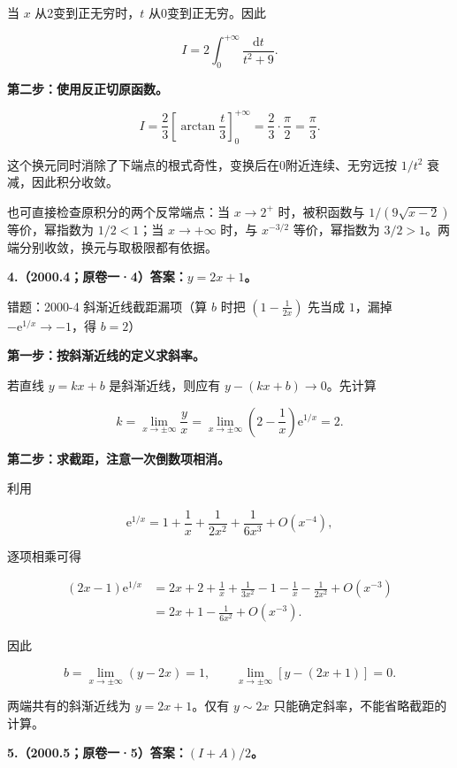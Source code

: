 \documentclass[UTF8,11pt,fontset=windows]{ctexart}
\begin{document}
当 $x$ 从2变到正无穷时，$t$ 从0变到正无穷。因此

$$
I=2\int_0^{+\infty}\frac{\mathrm dt}{t^2+9}.
$$

\textbf{第二步：使用反正切原函数。}

$$
I=\frac23\left[\arctan\frac t3\right]_0^{+\infty}
=\frac23\cdot\frac\pi2=\frac\pi3.
$$

这个换元同时消除了下端点的根式奇性，变换后在0附近连续、无穷远按 $1/t^2$ 衰减，因此积分收敛。

也可直接检查原积分的两个反常端点：当 $x\to2^+$ 时，被积函数与 $1/(9\sqrt{x-2})$ 等价，幂指数为 $1/2<1$；当 $x\to+\infty$ 时，与 $x^{-3/2}$ 等价，幂指数为 $3/2>1$。两端分别收敛，换元与取极限都有依据。

\clearpage

\textbf{4.（2000.4；原卷一·4）答案：$y=2x+1$。}

\begingroup\color{gray}错题：2000-4 斜渐近线截距漏项（算 $b$ 时把 $\left(1-\frac1{2x}\right)$ 先当成 $1$，漏掉 $-\mathrm e^{1/x}\to-1$，得 $b=2$）\par\endgroup

\textbf{第一步：按斜渐近线的定义求斜率。}

若直线 $y=kx+b$ 是斜渐近线，则应有 $y-(kx+b)\to0$。先计算

$$
k=\lim_{x\to\pm\infty}\frac yx
=\lim_{x\to\pm\infty}\left(2-\frac1x\right)\mathrm e^{1/x}=2.
$$

\textbf{第二步：求截距，注意一次倒数项相消。}

利用

$$
\mathrm e^{1/x}=1+\frac1x+\frac1{2x^2}+\frac1{6x^3}+O(x^{-4}),
$$

逐项相乘可得

$$
\begin{aligned}
(2x-1)\mathrm e^{1/x}
&=2x+2+\frac1x+\frac1{3x^2}
 -1-\frac1x-\frac1{2x^2}+O(x^{-3})\\
&=2x+1-\frac1{6x^2}+O(x^{-3}).
\end{aligned}
$$

因此

$$
b=\lim_{x\to\pm\infty}(y-2x)=1,
\qquad \lim_{x\to\pm\infty}[y-(2x+1)]=0.
$$

两端共有的斜渐近线为 $\boxed{y=2x+1}$。仅有 $y\sim2x$ 只能确定斜率，不能省略截距的计算。

\clearpage

\textbf{5.（2000.5；原卷一·5）答案：$(I+A)/2$。}
\end{document}
